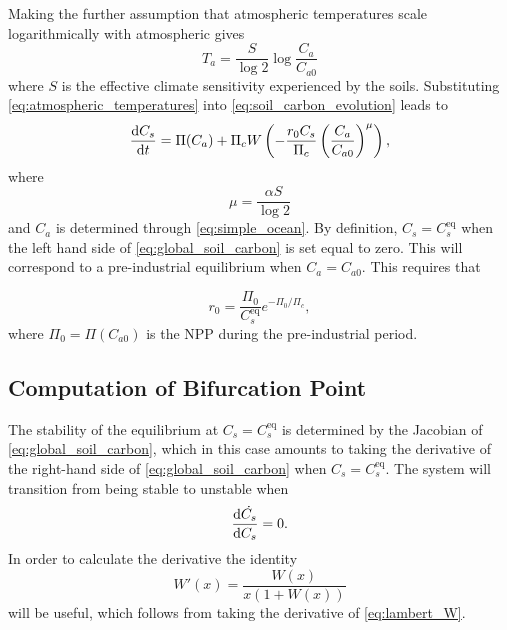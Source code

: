 Making the further assumption that atmospheric temperatures scale logarithmically with atmospheric  \parencite{Pierrehumbert2010} gives
\begin{equation}
  \label{eq:atmospheric_temperatures}
  T_a = \frac{S}{\log 2} \log \frac{C_a}{C_{a0}} 
\end{equation}
where $S$ is the effective climate sensitivity experienced by the soils. Substituting \cref{eq:atmospheric_temperatures} into \cref{eq:soil_carbon_evolution} 
leads to
\begin{equation}
  \label{eq:global_soil_carbon}
  \dv{C_s}{t} = \Pi(C_a) + \Pi_c W\left(-\frac{r_0C_s}{\Pi_c} \left(\frac{C_a}{C_{a0}}\right)^\mu \right),
\end{equation}
where
\begin{equation}
  \label{eq:mu_definition}
  \mu = \frac{\alpha S}{\log 2}
\end{equation}
and $C_a$ is determined through \cref{eq:simple_ocean}. By definition, $C_s = C_s^{\mathrm{eq}}$ when the left hand side of \cref{eq:global_soil_carbon} is set equal to zero.
This will correspond to a pre-industrial equilibrium when $C_a = C_{a0}$. This requires that 

\begin{equation}
  r_0 = \frac{\Pi_0}{C_s^{\mathrm{eq}}}e^{-\Pi_0/\Pi_c}, 
\end{equation}
where $\Pi_0 = \Pi\left(C_{a0}\right)$ is the NPP during the pre-industrial period.


\subsection{Computation of Bifurcation Point}
\label{sec:computation_of_bifurcation_point}
The stability of the equilibrium at $C_s = C_s^{\mathrm{eq}}$ is determined by the Jacobian of \cref{eq:global_soil_carbon}, which in this case amounts to
taking the derivative of the right-hand side of \cref{eq:global_soil_carbon} when $C_s = C_s^{\mathrm{eq}}$. The system will transition from being stable to unstable when
\begin{equation*}
  \dv{\dot{C_s}}{C_s} = 0.
\end{equation*}
In order to calculate the derivative the identity
\begin{equation}
  \label{eq:derivative_of_lambert_W}
  W'(x) = \frac{W(x)}{x\left(1 + W\left(x\right)\right)}
\end{equation}
will be useful, which follows from taking the derivative of \cref{eq:lambert_W}.

